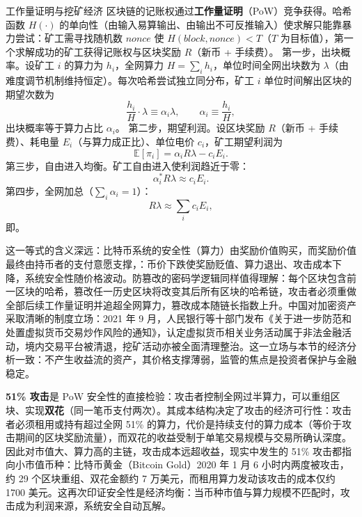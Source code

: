 \begin{derivation}{工作量证明与挖矿经济}{}
区块链的记账权通过\textbf{工作量证明}（PoW）竞争获得。哈希函数 $H(\cdot)$ 的单向性（由输入易算输出、由输出不可反推输入）使求解只能靠暴力尝试：矿工需寻找随机数 $nonce$ 使 $H(block, nonce) < T$（$T$ 为目标值），第一个求解成功的矿工获得记账权与区块奖励 $R$（新币 + 手续费）。
第一步，出块概率。设矿工 $i$ 的算力为 $h_i$，全网算力 $H = \sum_i h_i$，单位时间全网出块数为 $\lambda$（由难度调节机制维持恒定）。每次哈希尝试独立同分布，矿工 $i$ 单位时间解出区块的期望次数为
\[
\frac{h_i}{H} \cdot \lambda \equiv \alpha_i \lambda, \qquad \alpha_i \equiv \frac{h_i}{H},
\]
出块概率等于算力占比 $\alpha_i$。
第二步，期望利润。设区块奖励 $R$（新币 + 手续费）、耗电量 $E_i$（与算力成正比）、单位电价 $c_i$，矿工期望利润为
\[
\mathbb{E}[\pi_i] = \alpha_i R \lambda - c_i E_i.
\]
第三步，自由进入均衡。矿工自由进入使利润趋近于零：
\[
\alpha_i^* R \lambda \approx c_i E_i.
\]
第四步，全网加总（$\sum_i \alpha_i = 1$）：
\[
R\lambda \approx \sum_i c_i E_i,
\]
即。
\end{derivation}

这一等式的含义深远：比特币系统的安全性（算力）由奖励价值购买，而奖励价值最终由持币者的支付意愿支撑，：币价下跌使奖励贬值、算力退出、攻击成本下降，系统安全性随价格波动。防篡改的密码学逻辑同样值得理解：每个区块包含前一区块的哈希，篡改任一历史区块将改变其后所有区块的哈希链，攻击者必须重做全部后续工作量证明并追超全网算力，篡改成本随链长指数上升。中国对加密资产采取清晰的制度立场：2021 年 9 月，人民银行等十部门发布《关于进一步防范和处置虚拟货币交易炒作风险的通知》，认定虚拟货币相关业务活动属于非法金融活动，境内交易平台被清退，挖矿活动亦被全面清理整治。这一立场与本节的经济分析一致：不产生收益流的资产，其价格支撑薄弱，监管的焦点是投资者保护与金融稳定。

\textbf{51\% 攻击}是 PoW 安全性的直接检验：攻击者控制全网过半算力，可以重组区块、实现\textbf{双花}（同一笔币支付两次）。其成本结构决定了攻击的经济可行性：攻击者必须租用或持有超过全网 51\% 的算力，代价是持续支付的算力成本（等价于攻击期间的区块奖励流量），而双花的收益受制于单笔交易规模与交易所确认深度。因此对市值大、算力高的主链，攻击成本远超收益，现实中发生的 51\% 攻击都指向小市值币种：比特币黄金（Bitcoin Gold）2020 年 1 月 6 小时内两度被攻击，约 29 个区块重组、双花金额约 7 万美元，而租用算力发动该攻击的成本仅约 1700 美元。这再次印证安全性是经济均衡：当币种市值与算力规模不匹配时，攻击成为利润来源，系统安全自动瓦解。

